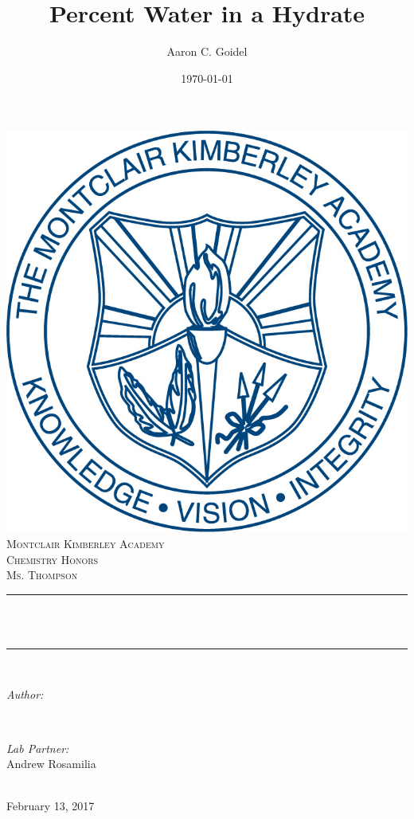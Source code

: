 \documentclass[12pt]{article}
\title{Percent Water in a Hydrate}								%
\author{Aaron C. Goidel}								%
\date{\today}											%
\makeatletter
\let\thetitle\@title
\let\theauthor\@author
\makeatother
\begin{document}

\begin{titlepage}
	\centering
	\vspace*{0.5 cm}
	\includegraphics[scale = 0.2]{Shield.jpg}\\[1.0 cm]	%
		\textsc{\LARGE Montclair Kimberley Academy}\\[2.0 cm]	%
		\textsc{\Large Chemistry Honors}\\[0.5 cm]				%
		\textsc{\large Ms. Thompson}\\[0.5 cm]				%
		\rule{\linewidth}{0.2 mm} \\[0.4 cm]
		{ \huge \bfseries \thetitle}\\
		\rule{\linewidth}{0.2 mm} \\[1.5 cm]
			
		\begin{minipage}{0.4\textwidth}
			\begin{flushleft} \large
				\emph{Author:}\\
				\theauthor
			\end{flushleft}
		\end{minipage}~
		\begin{minipage}{0.4\textwidth}
			\begin{flushright} \large
				\emph{Lab Partner:} \\
				Andrew Rosamilia 									%
			\end{flushright}
		\end{minipage}\\[2 cm]
			
		{\large February 13, 2017}\\[2 cm]
		 
		\vfill
			
		\end{titlepage}
		
\end{document}
